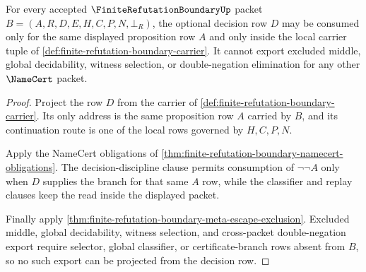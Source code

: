 \begin{theorem}
\label{thm:finite-refutation-boundary-decision-row-scope}
For every accepted $\FiniteRefutationBoundaryUp$ packet $B=(A,R,D,E,H,C,P,N,\bot_R)$, the optional decision row $D$ may be consumed only for the same displayed proposition row $A$ and only inside the local carrier tuple of \autoref{def:finite-refutation-boundary-carrier}. It cannot export excluded middle, global decidability, witness selection, or double-negation elimination for any other $\NameCert$ packet.
\end{theorem}
\begin{proof}
Project the row $D$ from the carrier of \autoref{def:finite-refutation-boundary-carrier}. Its only address is the same proposition row $A$ carried by $B$, and its continuation route is one of the local rows governed by $H,C,P,N$.

Apply the NameCert obligations of \autoref{thm:finite-refutation-boundary-namecert-obligations}. The decision-discipline clause permits consumption of $\neg\neg A$ only when $D$ supplies the branch for that same $A$ row, while the classifier and replay clauses keep the read inside the displayed packet.

Finally apply \autoref{thm:finite-refutation-boundary-meta-escape-exclusion}. Excluded middle, global decidability, witness selection, and cross-packet double-negation export require selector, global classifier, or certificate-branch rows absent from $B$, so no such export can be projected from the decision row.
\end{proof}

